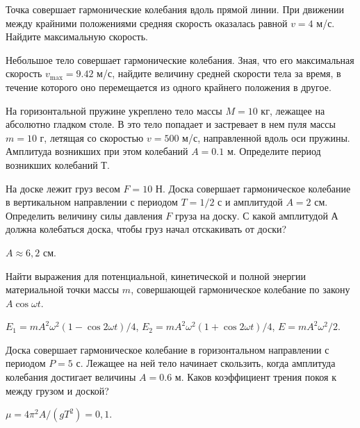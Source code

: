 \begin{ex}
Точка совершает гармонические колебания вдоль прямой линии. При движении между крайними положениями средняя скорость оказалась равной $v = 4$ м/с. Найдите максимальную скорость.
\end{ex}	

\begin{ex}
Небольшое тело совершает гармонические колебания. Зная, что его максимальная скорость $v_{\max} = 9.42$ м/с, найдите величину средней скорости тела за время, в течение которого оно перемещается из одного крайнего положения в другое.
\end{ex}	

\begin{ex}
На горизонтальной пружине укреплено тело массы $M = 10$ кг, лежащее на абсолютно гладком столе. В это тело попадает и застревает в нем пуля массы $m = 10$ г, летящая со скоростью $v = 500$ м/с, направленной вдоль оси пружины. Амплитуда возникших при этом колебаний $A = 0.1$ м. Определите период возникших колебаний $Т$.
\end{ex}	

\begin{ex} %
На доске лежит груз весом $F = 10$ Н. Доска совершает гармоническое колебание в вертикальном направлении с периодом $T = 1/2$ с и амплитудой $A = 2$ см. Определить величину силы давления $F$ груза на доску. С какой амплитудой А должна колебаться доска, чтобы груз начал отскакивать от доски?
\begin{ans}
$A \approx 6,2$ см.
\end{ans}
\end{ex}	

\begin{ex} %
Найти выражения для потенциальной, кинетической и полной энергии материальной точки массы $m$, совершающей гармоническое колебание по закону $A \cos \omega t$.
\begin{ans}
$E_1 = m A^2 \omega^2 (1 - \cos 2 \omega t)/4$, $E_2 = m A^2 \omega^2 (1 + \cos 2 \omega t)/4$, $E = m A^2 \omega^2 /2$.
\end{ans}
\end{ex}	

\begin{ex} %
Доска совершает гармоническое колебание в горизонтальном направлении с периодом $P = 5$ с. Лежащее на ней тело начинает скользить, когда амплитуда колебания достигает величины $A = 0.6$ м. Каков коэффициент трения покоя к между грузом и доской?
\begin{ans}
$\mu = 4 \pi^2 A / (gT^2) = 0,1$.
\end{ans}
\end{ex}	

